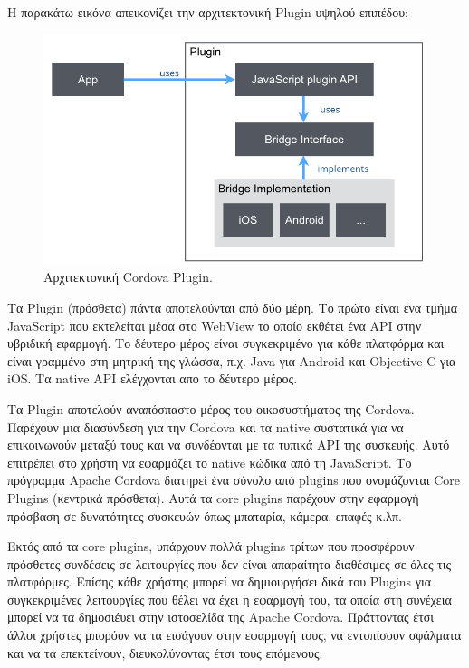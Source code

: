 \documentclass[a4paper,12pt]{article}
\begin{document}
			Η παρακάτω εικόνα απεικονίζει την αρχιτεκτονική Plugin υψηλού επιπέδου:

			\begin{center}
				
			\end{center}
			\begin{figure}[!htb]
				\caption{Αρχιτεκτονική Cordova Plugin.}
				\vspace*{0.5cm}
				\centering
			\includegraphics[width=0.9\linewidth]{Cordova2} 			  
			\end{figure}
			
			\newpage
			Τα Plugin (πρόσθετα) πάντα αποτελούνται από δύο μέρη. Το πρώτο είναι ένα τμήμα JavaScript που εκτελείται μέσα στο WebView το οποίο εκθέτει ένα API στην υβριδική εφαρμογή. 
			Το δέυτερο μέρος είναι συγκεκριμένο για κάθε πλατφόρμα και είναι γραμμένο στη μητρική της γλώσσα, π.χ. Java 
			για Android και Objective-C για iOS. Τα native API ελέγχονται απο το δέυτερο μέρος.

			Τα Plugin αποτελούν αναπόσπαστο μέρος του οικοσυστήματος της Cordova. Παρέχουν μια διασύνδεση για την Cordova και τα native 
			συστατικά για να επικοινωνούν μεταξύ τους και να συνδέονται με τα τυπικά API της συσκευής. Αυτό επιτρέπει στο χρήστη να εφαρμόζει το 
			native κώδικα από τη JavaScript. Το πρόγραμμα Apache Cordova διατηρεί ένα σύνολο από plugins που ονομάζονται Core Plugins (κεντρικά πρόσθετα). 
			Αυτά τα core plugins παρέχουν στην εφαρμογή πρόσβαση σε δυνατότητες συσκευών όπως μπαταρία, κάμερα, επαφές κ.λπ.

			Εκτός από τα core plugins, υπάρχουν πολλά plugins τρίτων που προσφέρουν πρόσθετες συνδέσεις σε λειτουργίες που δεν είναι 
			απαραίτητα διαθέσιμες σε όλες τις πλατφόρμες. Επίσης κάθε χρήστης μπορεί να δημιουργήσει δικά του Plugins για συγκεκριμένες λειτουργίες που θέλει να έχει
			η εφαρμογή του, τα οποία στη συνέχεια μπορεί να τα δημοσιέυει στην ιστοσελίδα της Apache Cordova. Πράττοντας έτσι άλλοι χρήστες μπορόυν να τα εισάγουν
			στην εφαρμογή τους, να εντοπίσουν σφάλματα και να τα επεκτείνουν, διευκολύνοντας έτσι τους επόμενους.
		\newpage
\end{document}
